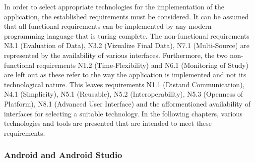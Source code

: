 In order to select appropriate technologies for the implementation of the application, the established requirements must be considered. It can be assumed that all functional requirements can be implemented by any modern programming language that is turing complete. The non-functional requirements N3.1 (Evaluation of Data), N3.2 (Vizualize Final Data), N7.1 (Multi-Source) are represented by the availability of various interfaces. Furthermore, the two non-functional requirements N1.2 (Time-Flexibility) and N6.1 (Monitoring of Study) are left out as these refer to the way the application is implemented and not its technological nature. This leaves requirements N1.1 (Distand Communication),  N4.1 (Simplicity), N5.1 (Reusable), N5.2 (Interoperability), N5.3 (Openness of Platform), N8.1 (Advanced User Interface) and the afformentioned availability of interfaces for selecting a suitable technology. In the following chapters, various technologies and tools are presented that are intended to meet these requirements.



\subsubsection{Android and Android Studio}

